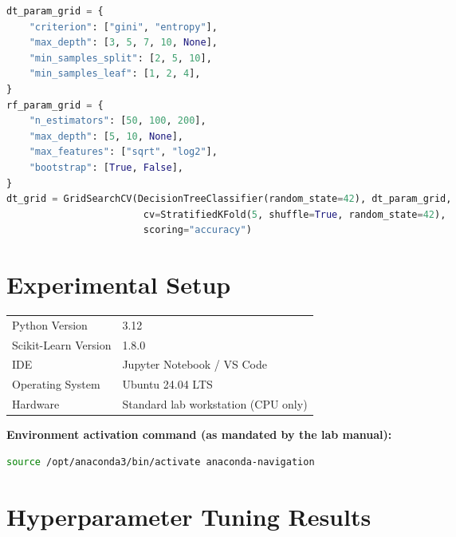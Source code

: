 \documentclass[12pt,a4paper]{article}
\newenvironment{fitwidth}
  {\begin{lrbox}{\fitbox}}
  {\end{lrbox}\ifdim\wd\fitbox>\linewidth\resizebox{\linewidth}{!}{\usebox{\fitbox}}\else\usebox{\fitbox}\fi}
\DeclareRobustCommand{\_}{\textunderscore\allowbreak}
\begin{document}
\begin{lstlisting}[language=Python, caption={Hyperparameter search spaces and 5-fold GridSearchCV, from \texttt{experiment5\_dt\_rf\_breast\_cancer.py}.}]
dt_param_grid = {
    "criterion": ["gini", "entropy"],
    "max_depth": [3, 5, 7, 10, None],
    "min_samples_split": [2, 5, 10],
    "min_samples_leaf": [1, 2, 4],
}
rf_param_grid = {
    "n_estimators": [50, 100, 200],
    "max_depth": [5, 10, None],
    "max_features": ["sqrt", "log2"],
    "bootstrap": [True, False],
}
dt_grid = GridSearchCV(DecisionTreeClassifier(random_state=42), dt_param_grid,
                        cv=StratifiedKFold(5, shuffle=True, random_state=42),
                        scoring="accuracy")
\end{lstlisting}

\section{Experimental Setup}
\begin{center}
\begin{minipage}{\linewidth}\centering
\begin{fitwidth}
\begin{tabular}{ll}
\toprule
Python Version & 3.12 \\
Scikit-Learn Version & 1.8.0 \\
IDE & Jupyter Notebook / VS Code \\
Operating System & Ubuntu 24.04 LTS \\
Hardware & Standard lab workstation (CPU only) \\
\bottomrule
\end{tabular}
\end{fitwidth}
\end{minipage}
\end{center}

\vspace{0.3cm}
\textbf{Environment activation command (as mandated by the lab manual):}
\begin{lstlisting}[language=bash]
source /opt/anaconda3/bin/activate anaconda-navigation
\end{lstlisting}

\section{Hyperparameter Tuning Results}
\end{document}
